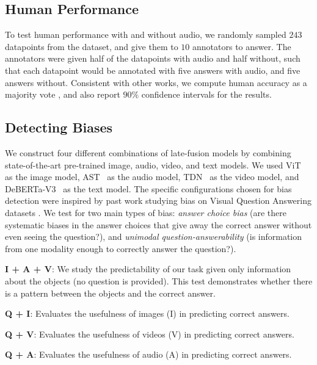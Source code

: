 \documentclass[runningheads]{llncs}
\begin{document}
\subsection{Human Performance} \label{sec:human}


To test human performance with and without audio, we randomly sampled $243$ datapoints from the dataset, and give them to $10$ annotators to answer. The annotators were given half of the datapoints with audio and half without, such that each datapoint would be annotated with five answers with audio, and five answers without. Consistent with other works, we compute human accuracy as a majority vote \cite{bisk2020piqa,zellers2019vcr}, and also report $90\%$ confidence intervals for the results.

\subsection{Detecting Biases} \label{sec:bias}


We construct four different combinations of late-fusion models by combining state-of-the-art pre-trained image, audio, video, and text models. We used ViT~\cite{dosovitskiy2020vit} as the image model, AST~\cite{gong2021ast} as the audio model, TDN~\cite{wang2021tdn} as the video model, and DeBERTa-V3~\cite{he2021debertav3,he2021deberta} as the text model. The specific configurations chosen for bias detection were inspired by past work studying bias on Visual Question Answering datasets \cite{cadene2019rubi,yang2020gives,zellers2019vcr}. We test for two main types of bias: \textit{answer choice bias} (are there systematic biases in the answer choices that give away the correct answer without even seeing the question?), and \textit{unimodal question-answerability} (is information from one modality enough to correctly answer the question?).

\noindent\textbf{I + A + V}: We study the predictability of our task given only information about the objects (no question is provided). This test demonstrates whether there is a pattern between the objects and the correct answer.

\noindent\textbf{Q + I}: Evaluates the usefulness of images (I) in predicting correct answers.

\noindent\textbf{Q + V}: Evaluates the usefulness of videos (V) in predicting correct answers.

\noindent\textbf{Q + A}: Evaluates the usefulness of audio (A) in predicting correct answers.
\end{document}
